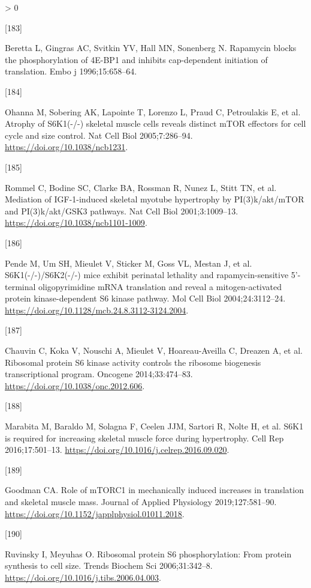 \documentclass[twoside,10pt]{gihclass} %
\newlength{\cslhangindent}
\newlength{\csllabelwidth}
\newenvironment{CSLReferences}[3] %
 {%
  \setlength{\parindent}{0pt}
  \ifodd #1 \everypar{\setlength{\hangindent}{\cslhangindent}}\ignorespaces\fi
  \ifnum #2 > 0
  \setlength{\parskip}{#2\baselineskip}
  \fi
 }%
 {}
\newcommand{\CSLLeftMargin}[1]{\parbox[t]{\maxof{\widthof{#1}}{\csllabelwidth}}{#1}}
\newcommand{\CSLRightInline}[1]{\parbox[t]{\linewidth}{#1}}
\begin{document}
\begin{CSLReferences}{0}{0}
\leavevmode\hypertarget{ref-RN2840}{}%
\CSLLeftMargin{{[}183{]} }
\CSLRightInline{Beretta L, Gingras AC, Svitkin YV, Hall MN, Sonenberg N. Rapamycin blocks the phosphorylation of 4E-BP1 and inhibits cap-dependent initiation of translation. Embo j 1996;15:658--64.}

\leavevmode\hypertarget{ref-RN2828}{}%
\CSLLeftMargin{{[}184{]} }
\CSLRightInline{Ohanna M, Sobering AK, Lapointe T, Lorenzo L, Praud C, Petroulakis E, et al. Atrophy of S6K1(-/-) skeletal muscle cells reveals distinct mTOR effectors for cell cycle and size control. Nat Cell Biol 2005;7:286--94. \url{https://doi.org/10.1038/ncb1231}.}

\leavevmode\hypertarget{ref-RN783}{}%
\CSLLeftMargin{{[}185{]} }
\CSLRightInline{Rommel C, Bodine SC, Clarke BA, Rossman R, Nunez L, Stitt TN, et al. Mediation of IGF-1-induced skeletal myotube hypertrophy by PI(3)k/akt/mTOR and PI(3)k/akt/GSK3 pathways. Nat Cell Biol 2001;3:1009--13. \url{https://doi.org/10.1038/ncb1101-1009}.}

\leavevmode\hypertarget{ref-RN2827}{}%
\CSLLeftMargin{{[}186{]} }
\CSLRightInline{Pende M, Um SH, Mieulet V, Sticker M, Goss VL, Mestan J, et al. S6K1(-/-)/S6K2(-/-) mice exhibit perinatal lethality and rapamycin-sensitive 5'-terminal oligopyrimidine mRNA translation and reveal a mitogen-activated protein kinase-dependent S6 kinase pathway. Mol Cell Biol 2004;24:3112--24. \url{https://doi.org/10.1128/mcb.24.8.3112-3124.2004}.}

\leavevmode\hypertarget{ref-RN2321}{}%
\CSLLeftMargin{{[}187{]} }
\CSLRightInline{Chauvin C, Koka V, Nouschi A, Mieulet V, Hoareau-Aveilla C, Dreazen A, et al. Ribosomal protein S6 kinase activity controls the ribosome biogenesis transcriptional program. Oncogene 2014;33:474--83. \url{https://doi.org/10.1038/onc.2012.606}.}

\leavevmode\hypertarget{ref-RN2849}{}%
\CSLLeftMargin{{[}188{]} }
\CSLRightInline{Marabita M, Baraldo M, Solagna F, Ceelen JJM, Sartori R, Nolte H, et al. S6K1 is required for increasing skeletal muscle force during hypertrophy. Cell Rep 2016;17:501--13. \url{https://doi.org/10.1016/j.celrep.2016.09.020}.}

\leavevmode\hypertarget{ref-RN2320}{}%
\CSLLeftMargin{{[}189{]} }
\CSLRightInline{Goodman CA. Role of mTORC1 in mechanically induced increases in translation and skeletal muscle mass. Journal of Applied Physiology 2019;127:581--90. \url{https://doi.org/10.1152/japplphysiol.01011.2018}.}

\leavevmode\hypertarget{ref-RN2824}{}%
\CSLLeftMargin{{[}190{]} }
\CSLRightInline{Ruvinsky I, Meyuhas O. Ribosomal protein S6 phosphorylation: From protein synthesis to cell size. Trends Biochem Sci 2006;31:342--8. \url{https://doi.org/10.1016/j.tibs.2006.04.003}.}


\end{CSLReferences}
\end{document}

